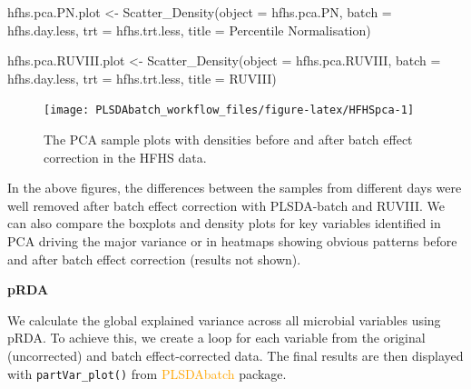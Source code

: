 \documentclass[
]{book}
\newenvironment{Shaded}{\begin{snugshade}}{\end{snugshade}}
\newcommand{\AttributeTok}[1]{\textcolor[rgb]{0.77,0.63,0.00}{#1}}
\newcommand{\FunctionTok}[1]{\textcolor[rgb]{0.00,0.00,0.00}{#1}}
\newcommand{\NormalTok}[1]{#1}
\newcommand{\OtherTok}[1]{\textcolor[rgb]{0.56,0.35,0.01}{#1}}
\newcommand{\StringTok}[1]{\textcolor[rgb]{0.31,0.60,0.02}{#1}}
\begin{document}
\begin{Shaded}
\begin{Highlighting}[]
\NormalTok{hfhs.pca.PN.plot }\OtherTok{\textless{}{-}} 
  \FunctionTok{Scatter\_Density}\NormalTok{(}\AttributeTok{object =}\NormalTok{ hfhs.pca.PN, }
                  \AttributeTok{batch =}\NormalTok{ hfhs.day.less, }
                  \AttributeTok{trt =}\NormalTok{ hfhs.trt.less, }
                  \AttributeTok{title =} \StringTok{\textquotesingle{}Percentile Normalisation\textquotesingle{}}\NormalTok{)}
\end{Highlighting}
\end{Shaded}

\begin{Shaded}
\begin{Highlighting}[]
\NormalTok{hfhs.pca.RUVIII.plot }\OtherTok{\textless{}{-}} 
  \FunctionTok{Scatter\_Density}\NormalTok{(}\AttributeTok{object =}\NormalTok{ hfhs.pca.RUVIII, }
                  \AttributeTok{batch =}\NormalTok{ hfhs.day.less, }
                  \AttributeTok{trt =}\NormalTok{ hfhs.trt.less, }
                  \AttributeTok{title =} \StringTok{\textquotesingle{}RUVIII\textquotesingle{}}\NormalTok{)}
\end{Highlighting}
\end{Shaded}

\begin{figure}

{\centering \texttt{[image: PLSDAbatch\_workflow\_files/figure-latex/HFHSpca-1]} 

}

\caption{The PCA sample plots with densities before and after batch effect correction in the HFHS data.}\label{fig:HFHSpca}
\end{figure}

In the above figures, the differences between the samples from different days were well removed after batch effect correction with PLSDA-batch and RUVIII. We can also compare the boxplots and density plots for key variables identified in PCA driving the major variance or in heatmaps showing obvious patterns before and after batch effect correction (results not shown).

\textbf{pRDA}

We calculate the global explained variance across all microbial variables using pRDA. To achieve this, we create a loop for each variable from the original (uncorrected) and batch effect-corrected data. The final results are then displayed with \texttt{partVar\_plot()} from \textcolor{orange}{PLSDAbatch} package.
\end{document}
